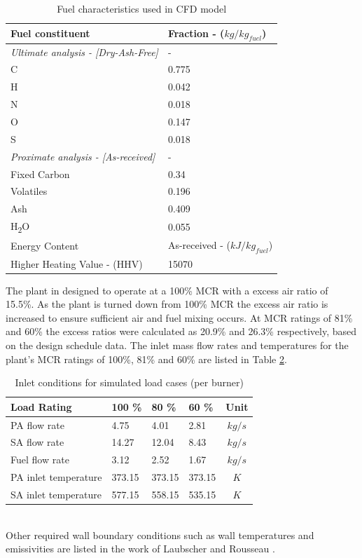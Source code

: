 \documentclass{webofc}
\begin{document}
\begin{table}[h!]
\centering
\caption{Fuel characteristics used in CFD model} \label{tab_fuel}
\begin{tabular}{ll}
\hline
Fuel constituent & Fraction - ($kg/kg_{fuel}$)   \\
\hline
\textit{Ultimate analysis - [Dry-Ash-Free]} & -  \\
C & 0.775 \\
H & 0.042 \\
N & 0.018 \\
O & 0.147 \\
S & 0.018 \\
\textit{Proximate analysis - [As-received]} & -\\
Fixed Carbon & 0.34\\
Volatiles & 0.196\\
Ash & 0.409\\
H\textsubscript{2}O & 0.055\\
\hline
Energy Content & As-received - ($kJ/kg_{fuel}$)\\
\hline
Higher Heating Value - (HHV) & 15070 \\
\hline
\end{tabular}
\end{table}

The plant in designed to operate at a 100\% MCR with a excess air ratio of 15.5\%. As the plant is turned down from 100\% MCR the excess air ratio is increased to ensure sufficient air and fuel mixing occurs. At MCR ratings of 81\% and 60\% the excess ratios were calculated as 20.9\% and 26.3\% respectively, based on the design schedule data. The inlet mass flow rates and temperatures for the plant's MCR ratings of 100\%, 81\% and 60\% are listed in Table \ref{tab_inlets}.
\begin{table}[h!]
\centering
\caption{Inlet conditions for simulated load cases (per burner)}\label{tab_inlets}       
\begin{tabular}{llllc}
\hline
Load Rating & 100 \% & 80 \% & 60 \% & Unit  \\
\hline
PA flow rate & 4.75 & 4.01 & 2.81 & $kg/s$   \\
SA flow rate & 14.27 & 12.04 & 8.43 & $kg/s$ \\
Fuel flow rate & 3.12 & 2.52 & 1.67 & $kg/s$ \\
PA inlet temperature & 373.15 & 373.15 & 373.15 & $K$ \\
SA inlet temperature & 577.15 &558.15 & 535.15 & $K$  \\
\hline
\end{tabular}
\end{table}\\
Other required wall boundary conditions such as wall temperatures and emissivities are listed in the work of Laubscher and Rousseau \cite{laubscher_1}.
\end{document}
